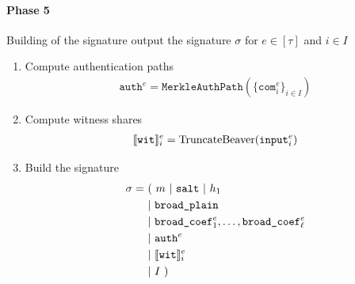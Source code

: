 \documentclass[11pt]{report}
\theoremstyle{definition}
\theoremstyle{plain}
\begin{document}
\begin{protocol}
  \paragraph{Phase 5} Building of the signature output the signature $\sigma$ for $e \in [\tau]$ and $i \in I$
  \begin{enumerate}[itemsep=0pt, topsep=0pt, parsep=0pt]
    \item Compute authentication paths
          \begin{align*}
            \texttt{auth}^e = \texttt{MerkleAuthPath}(\{\texttt{com}^e_i\}_{i \in I})
          \end{align*}
    \item Compute witness shares
          \begin{align*}
            \llbracket \texttt{wit} \rrbracket_i^e = \text{TruncateBeaver}(\texttt{input}^e_i)
          \end{align*}
    \item Build the signature
          \begin{align*}
            \sigma = & \ (\ m\ |\ \texttt{salt}\ |\ h_1                                  \\
                     & \ |\ \texttt{broad\_plain}                                        \\
                     & \ |\ \texttt{broad\_coef}^e_1, \dots, \texttt{broad\_coef}^e_\ell \\
                     & \ |\ \texttt{auth}^e                                              \\
                     & \ |\ \sh{\texttt{wit}}_i^e                                        \\
                     & \ |\ I\ )
          \end{align*}
  \end{enumerate}
\end{protocol}

\newpage
\end{document}
